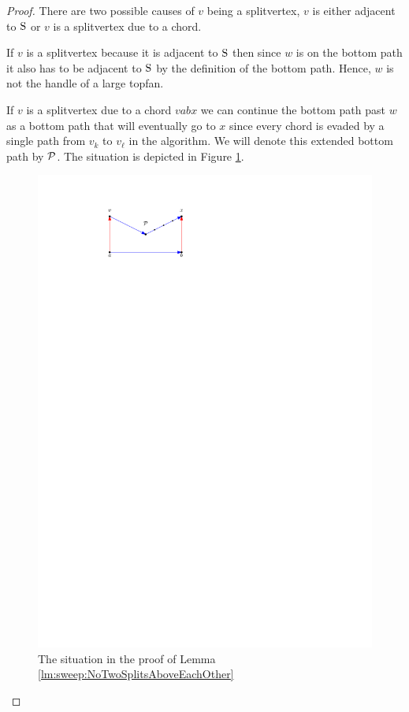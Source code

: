     \begin{proof}
      There are two possible causes of $v$ being a splitvertex, $v$ is either adjacent to $\pS$ or $v$ is a splitvertex due to a chord.

      If $v$ is a splitvertex because it is adjacent to $\pS$ then since $w$ is on the bottom path it also has to be adjacent to $\pS$ by the definition of the bottom path.
      Hence, $w$ is not the handle of a large topfan.

      If $v$ is a splitvertex due to a chord $v a b x$ we can continue the bottom path past $w$ as a bottom path that will eventually go to $x$ since every chord is evaded by a single path from $v_k$ to $v_\ell$ in the algorithm.
      We will denote this extended bottom path by $\P$.
      The situation is depicted in Figure \ref{fig:sweep:botomPathChord}.

      \begin{figure}[b]
        \centering
        \includegraphics[scale=1]{unifiedAlgo/img/sweep/bottompathChord.pdf}
        \caption{The situation in the proof of Lemma \ref{lm:sweep:NoTwoSplitsAboveEachOther}}
        \label{fig:sweep:botomPathChord}
      \end{figure}


\end{proof}
